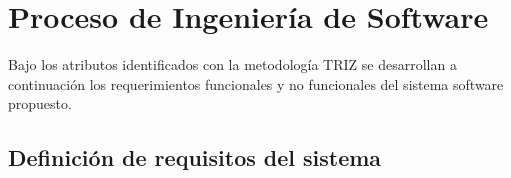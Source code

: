 \documentclass[12pt]{article}
\begin{document}






\section{Proceso de Ingeniería de Software  } %


Bajo los atributos identificados con la metodología TRIZ se desarrollan a continuación los requerimientos funcionales y no funcionales del sistema software propuesto.


\subsection{Definición de requisitos del sistema}
\end{document}
